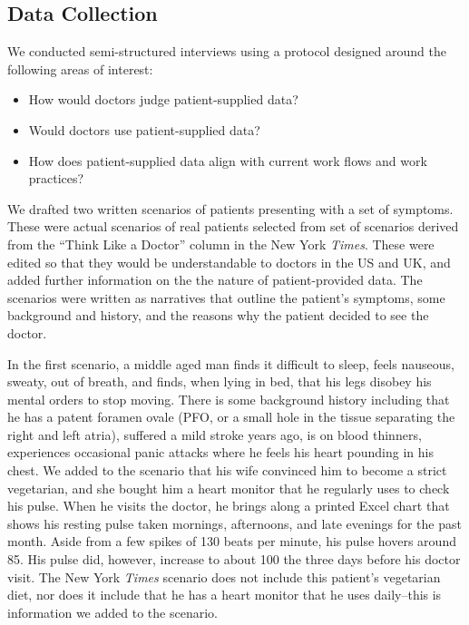 \documentclass{sigchi}
\begin{document}
\subsection{Data Collection}
We conducted semi-structured interviews using a protocol designed around the following areas of interest:
\begin{itemize}
    \item How would doctors judge patient-supplied data?
    \item Would doctors use patient-supplied data?
    \item How does patient-supplied data align with current work flows and work practices?
\end{itemize}

We drafted two written scenarios of patients presenting with a set of symptoms.  These were actual scenarios of real patients selected from set of scenarios derived from the ``Think Like a Doctor'' column in the New York \emph{Times}.  These were edited  so that they would be understandable to doctors in the US and UK, and added further information on the the nature of patient-provided data.  The scenarios were written as narratives that outline the patient's symptoms, some background and history, and the reasons why the patient decided to see the doctor.  

In the first scenario, a middle aged man finds it difficult to sleep, feels nauseous, sweaty, out of breath, and finds, when lying in bed, that his legs disobey his mental orders to stop moving.   There is some background history including that he has a patent foramen ovale (PFO, or a small hole in the tissue separating the right and left atria), suffered a mild stroke years ago, is on blood thinners, experiences occasional panic attacks where he feels his heart pounding in his chest.  We added to the scenario that his wife convinced him to become a strict vegetarian, and she bought him a heart monitor that he regularly uses to check his pulse. When he visits the doctor, he brings along a printed Excel chart that shows his resting pulse taken mornings, afternoons, and late evenings for the past month. Aside from a few spikes of 130 beats per minute, his pulse hovers around 85.  His pulse did, however, increase to about 100 the three days before his doctor visit.  The New York \emph{Times} scenario does not include this patient's vegetarian diet, nor does it include that he has a heart monitor that he uses daily--this is information we added to the scenario.
\end{document}
